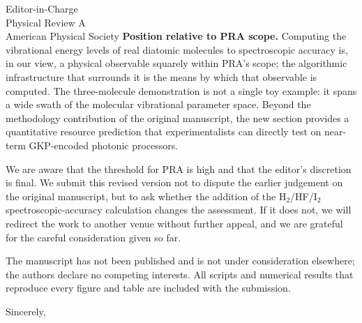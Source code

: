 \documentclass[11pt]{letter}
\begin{document}
\begin{letter}{Editor-in-Charge \\ Physical Review A \\ American Physical
Society}
\textbf{Position relative to PRA scope.} Computing the vibrational
energy levels of real diatomic molecules to spectroscopic accuracy is, in
our view, a physical observable squarely within PRA's scope; the
algorithmic infrastructure that surrounds it is the means by which that
observable is computed. The three-molecule demonstration is not a single
toy example: it spans a wide swath of the molecular vibrational
parameter space. Beyond the methodology contribution of the original
manuscript, the new section provides a quantitative resource
prediction that experimentalists can directly test on near-term
GKP-encoded photonic processors.

We are aware that the threshold for PRA is high and that the editor's
discretion is final. We submit this revised version not to dispute the
earlier judgement on the original manuscript, but to ask whether the
addition of the H$_2$/HF/I$_2$ spectroscopic-accuracy calculation
changes the assessment. If it does not, we will redirect the work to
another venue without further appeal, and we are grateful for the
careful consideration given so far.

The manuscript has not been published and is not under consideration
elsewhere; the authors declare no competing interests. All scripts
and numerical results that reproduce every figure and table are
included with the submission.

\closing{Sincerely,}

\end{letter}
\end{document}
